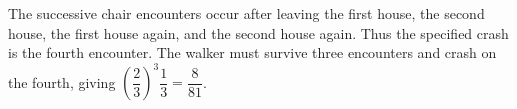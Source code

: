 The successive chair encounters occur after leaving the first house, the second house, the first house again, and the second house again. Thus the specified crash is the fourth encounter. The walker must survive three encounters and crash on the fourth, giving $\left(\dfrac{2}{3}\right)^3\dfrac{1}{3}=\boxed{\dfrac{8}{81}}$.

